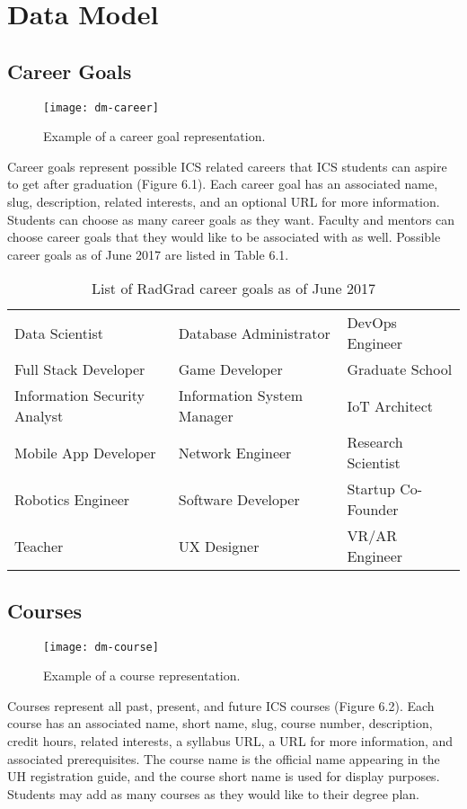 \section{Data Model}
\subsection{Career Goals}
\begin{figure}[htbp!]
\centering
\texttt{[image: dm-career]}
\caption{Example of a career goal representation.}
\end{figure}
Career goals represent possible ICS related careers that ICS students can aspire to get after graduation (Figure 6.1). Each career goal has an associated name, slug, description, related interests, and an optional URL for more information. Students can choose as many career goals as they want. Faculty and mentors can choose career goals that they would like to be associated with as well. Possible career goals as of June 2017 are listed in Table 6.1.

\begin{table}[htbp!]
\centering
\begin{tabular}{ l l l } 
 Data Scientist & Database Administrator & DevOps Engineer \\ 
 Full Stack Developer & Game Developer & Graduate School \\ 
 Information Security Analyst & Information System Manager & IoT Architect \\ 
 Mobile App Developer & Network Engineer & Research Scientist \\
 Robotics Engineer & Software Developer & Startup Co-Founder \\
 Teacher & UX Designer & VR/AR Engineer 
\end{tabular}
\caption{List of RadGrad career goals as of June 2017}
\label{table:1}
\end{table}

\subsection{Courses}
\begin{figure}[htbp!]
\centering
\texttt{[image: dm-course]}
\caption{Example of a course representation.}
\end{figure}
Courses represent all past, present, and future ICS courses (Figure 6.2). Each course has an associated name, short name, slug, course number, description, credit hours, related interests, a syllabus URL, a URL for more information, and associated prerequisites. The course name is the official name appearing in the UH registration guide, and the course short name is used for display purposes. Students may add as many courses as they would like to their degree plan. 

